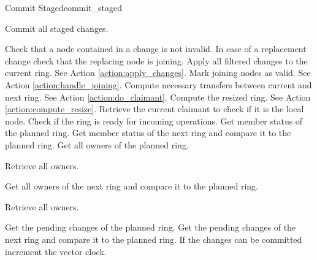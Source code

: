 \begin{actionbox}{Commit Staged}{commit_staged}
	\begin{action}
		 Commit all staged changes.
		\begin{action}
			 Check that a node contained in a change is not invalid.
			 In case of a replacement change check that the replacing node is joining.
			 Apply all filtered changes to the current ring. See Action \ref{action:apply_changes}.
			 Mark joining nodes as valid. See Action \ref{action:handle_joining}.
			 Compute necessary transfers between current and next ring. See Action \ref{action:do_claimant}.
			 Compute the resized ring. See Action \ref{action:compute_resize}.
			 Retrieve the current claimant to check if it is the local node.
			 Check if the ring is ready for incoming operations.
			 Get member status of the planned ring.
			 Get member status of the next ring and compare it to the planned ring.
			 Get all owners of the planned ring.
			\begin{action}
				 Retrieve all owners.
			\end{action}
			 Get all owners of the next ring and compare it to the planned ring.
			\begin{action}
				 Retrieve all owners.
			\end{action}
			 Get the pending changes of the planned ring.
			 Get the pending changes of the next ring and compare it to the planned ring.
			 If the changes can be committed increment the vector clock.
		\end{action}
	\end{action}
\end{actionbox}


